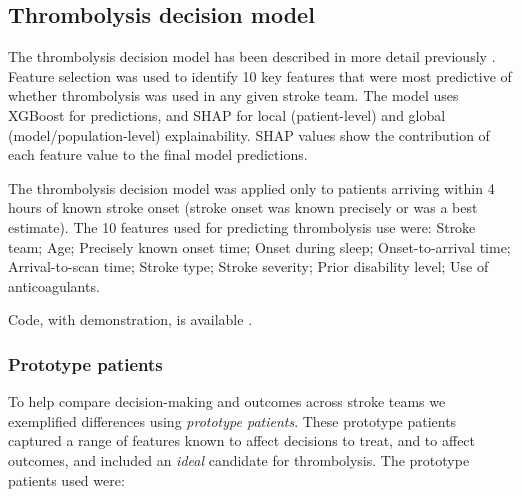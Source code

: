 \subsection{Thrombolysis decision model}

The thrombolysis decision model has been described in more detail previously \cite{pearn_what_2023}. Feature selection was used to identify 10 key features that were most predictive of whether thrombolysis was used in any given stroke team. The model uses XGBoost \cite{chen_xgboost_2016} for predictions, and SHAP \cite{lundberg_unified_2017} for local (patient-level) and global (model/population-level) explainability. SHAP values show the contribution of each feature value to the final model predictions.

The thrombolysis decision model was applied only to patients arriving within 4 hours of known stroke onset (stroke onset was known precisely or was a best estimate). The 10 features used for predicting thrombolysis use were: Stroke team; Age; Precisely known onset time; Onset during sleep; Onset-to-arrival time; Arrival-to-scan time; Stroke type; Stroke severity; Prior disability level; Use of anticoagulants.

Code, with demonstration, is available \cite{allen_samuel_code_2024}.

\subsubsection{Prototype patients}

To help compare decision-making and outcomes across stroke teams we exemplified differences using \textit{prototype patients}. These prototype patients captured a range of features known to affect decisions to treat, and to affect outcomes, and included an \textit{ideal} candidate for thrombolysis. The prototype patients used were:

